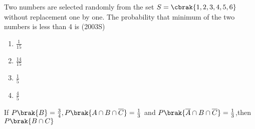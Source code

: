 
\iffalse
  \title{Assignment}
  \author{AI24BTECH11024-Pappuri Prahladha}
  \section{mcq-single}
\fi

    \item Two numbers are selected randomly from the set $S=\cbrak{1,2,3,4,5,6}$ without replacement one by one. The probability that minimum of the two numbers is less than 4 is   \hfill (2003S)
\begin{multicols}{4}
\begin{enumerate}
    \item $\frac{1}{15}$
    \item $\frac{14}{15}$
    \item $\frac{1}{5}$
    \item $\frac{4}{5}$
\end{enumerate}
\end{multicols}
\item If $P\brak{B}=\frac{3}{4},P\brak{A\cap B \cap \overline{C}}=\frac{1}{3}$ and $P\brak{\overline{A}\cap B\cap \overline{C}}=\frac{1}{3}$,then $P\brak{B\cap C}$ 

